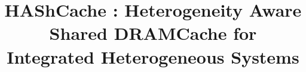 \documentclass{sig-alternate}
\newcommand{\cachename}{HAShCache }
\begin{document}
\title{\cachename: Heterogeneity Aware Shared DRAMCache for Integrated Heterogeneous Systems}

\maketitle
\thispagestyle{firstpage}
\pagestyle{plain}






















\end{document}
